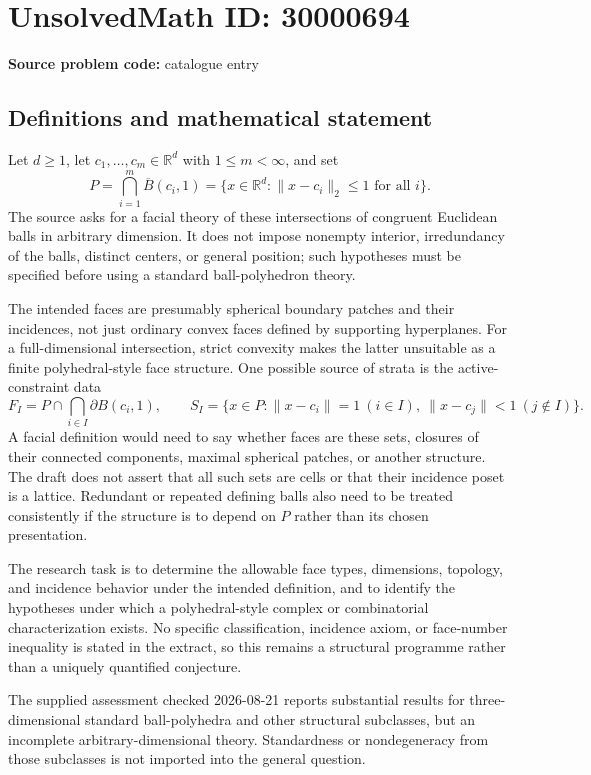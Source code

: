 \documentclass[11pt]{article}
\newcommand{\R}{\mathbb{R}}
\begin{document}
\section*{UnsolvedMath ID: 30000694}
\textbf{Source problem code:} catalogue entry
\subsection{Definitions and mathematical statement}
Let \(d\geq1\), let \(c_1,\ldots,c_m\in\R^d\) with \(1\leq m<\infty\), and set
\[
P=\bigcap_{i=1}^m\overline B(c_i,1)
=\{x\in\R^d:\|x-c_i\|_2\leq1\text{ for all }i\}.
\]
The source asks for a facial theory of these intersections of congruent Euclidean balls in arbitrary dimension. It does not impose nonempty interior, irredundancy of the balls, distinct centers, or general position; such hypotheses must be specified before using a standard ball-polyhedron theory.

The intended faces are presumably spherical boundary patches and their incidences, not just ordinary convex faces defined by supporting hyperplanes. For a full-dimensional intersection, strict convexity makes the latter unsuitable as a finite polyhedral-style face structure. One possible source of strata is the active-constraint data
\[
F_I=P\cap\bigcap_{i\in I}\partial B(c_i,1),\qquad
S_I=\{x\in P:\|x-c_i\|=1\ (i\in I),\ \|x-c_j\|<1\ (j\notin I)\}.
\]
A facial definition would need to say whether faces are these sets, closures of their connected components, maximal spherical patches, or another structure. The draft does not assert that all such sets are cells or that their incidence poset is a lattice. Redundant or repeated defining balls also need to be treated consistently if the structure is to depend on \(P\) rather than its chosen presentation.

The research task is to determine the allowable face types, dimensions, topology, and incidence behavior under the intended definition, and to identify the hypotheses under which a polyhedral-style complex or combinatorial characterization exists. No specific classification, incidence axiom, or face-number inequality is stated in the extract, so this remains a structural programme rather than a uniquely quantified conjecture.

The supplied assessment checked 2026-08-21 reports substantial results for three-dimensional standard ball-polyhedra and other structural subclasses, but an incomplete arbitrary-dimensional theory. Standardness or nondegeneracy from those subclasses is not imported into the general question.
\end{document}
